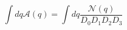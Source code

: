 \documentclass[10pt]{article}
\begin{document}
\[\int dq \mathcal{A}(q) = \int dq \frac{\mathcal{N}(q)}{D_0 D_1 D_2 D_3}\]
\end{document}

